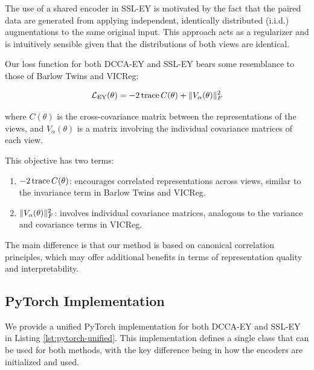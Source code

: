 The use of a shared encoder in SSL-EY is motivated by the fact that the paired data are generated from applying independent, identically distributed (i.i.d.) augmentations to the same original input. This approach acts as a regularizer and is intuitively sensible given that the distributions of both views are identical.

Our loss function for both DCCA-EY and SSL-EY bears some resemblance to those of Barlow Twins and VICReg:

\begin{align*}
    \mathcal{L}_\text{EY}(\theta) = - 2 \operatorname{trace} C(\theta) + \lVert V_\alpha(\theta)\rVert_F^2
\end{align*}

where $C(\theta)$ is the cross-covariance matrix between the representations of the views, and $V_\alpha(\theta)$ is a matrix involving the individual covariance matrices of each view.

This objective has two terms:
\begin{enumerate}
    \item $- 2 \operatorname{trace} C(\theta)$: encourages correlated representations across views, similar to the invariance term in Barlow Twins and VICReg.
    \item $\lVert V_\alpha(\theta)\rVert_F^2$: involves individual covariance matrices, analogous to the variance and covariance terms in VICReg.
\end{enumerate}

The main difference is that our method is based on canonical correlation principles, which may offer additional benefits in terms of representation quality and interpretability.

\subsection{PyTorch Implementation}

We provide a unified PyTorch implementation for both DCCA-EY and SSL-EY in Listing \ref{lst:pytorch-unified}. This implementation defines a single class that can be used for both methods, with the key difference being in how the encoders are initialized and used.

